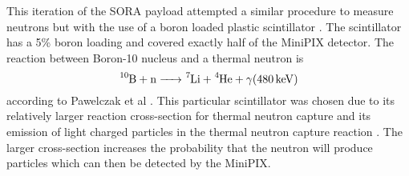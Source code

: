 This iteration of the SORA payload attempted a similar procedure to measure neutrons but with the use of a boron loaded plastic scintillator \cite{BoronScintillator}.
The scintillator has a 5\% boron loading and covered exactly half of the MiniPIX detector.
The reaction between Boron-10 nucleus and a thermal neutron is \[\ce{^10B + n -> ^7Li + ^4He + \gamma (\SI{480}{\kilo\eV})}\] according to Pawelczak et al \cite{Pawelczak}.
This particular scintillator was chosen due to its relatively larger reaction cross-section for thermal neutron capture and its emission of light charged particles in the thermal neutron capture reaction \cite{Pawelczak}.
The larger cross-section increases the probability that the neutron will produce particles which can then be detected by the MiniPIX.